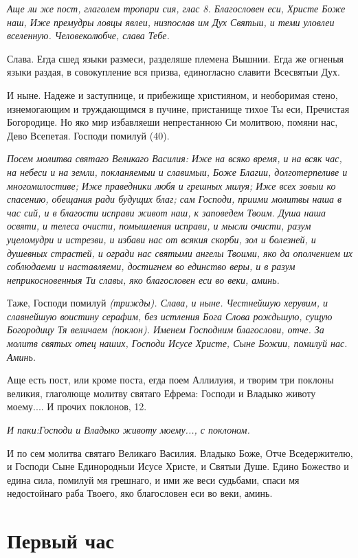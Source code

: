 \itshape Аще ли же пост, глаголем тропари сия, глас 8.\normalfont{} Благословен еси, Христе Боже наш, Иже премудры ловцы явлеи, низпослав им Дух Святыи, и теми уловлеи вселенную. Человеколюбче, слава Тебе.


Слава. Егда сшед языки размеси, разделяше племена Вышнии. Егда же огненыя языки раздая, в совокупление вся призва, единогласно славити Всесвятыи Дух.


И ныне. Надеже и заступнице, и прибежище християном, и необоримая стено, изнемогающим и труждающимся в пучине, пристанище тихое Ты еси, Пречистая Богородице. Но яко мир избавляеши непрестанною Си молитвою, помяни нас, Дево Всепетая. Господи помилуй (40).


\itshape Посем молитва святаго Великаго Василия:\normalfont{} Иже на всяко время, и на всяк час, на небеси и на земли, покланяемыи и славимыи, Боже Благии, долготерпеливе и многомилостиве; Иже праведники любя и грешных милуя; Иже всех зовыи ко спасению, обещания ради будущих благ; сам Господи, приими молитвы наша в час сий, и в благости исправи живот наш, к заповедем Твоим. Душа наша освяти, и телеса очисти, помышления исправи, и мысли очисти, разум уцеломудри и истрезви, и избави нас от всякия скорби, зол и болезней, и душевных страстей, и огради нас святыми ангелы Твоими, яко да ополчением их соблюдаеми и наставляеми, достигнем во единство веры, и в разум неприкосновенныя Ти славы, яко благословен еси во веки, аминь.


Таже, Господи помилуй \itshape (трижды)\normalfont{}. Слава, и ныне. Честнейшую херувим, и славнейшую воистину серафим, без истления Бога Слова рождьшую, сущую Богородицу Тя величаем \itshape (поклон)\normalfont{}. Именем Господним благослови, отче. За молитв святых отец наших, Господи Исусе Христе, Сыне Божии, помилуй нас. Аминь.


Аще есть пост, или кроме поста, егда поем Аллилуия, и творим три поклоны великия, глаголюще молитву святаго Ефрема: Господи и Владыко животу моему.... И прочих поклонов, 12.


\itshape И паки:\normalfont{}Господи и Владыко животу моему..., с поклоном.


И по сем молитва святаго Великаго Василия. Владыко Боже, Отче Вседержителю, и Господи Сыне Единородныи Исусе Христе, и Святыи Душе. Едино Божество и едина сила, помилуй мя грешнаго, и ими же веси судьбами, спаси мя недостойнаго раба Твоего, яко благословен еси во веки, аминь.




\section{Первый час}
 


